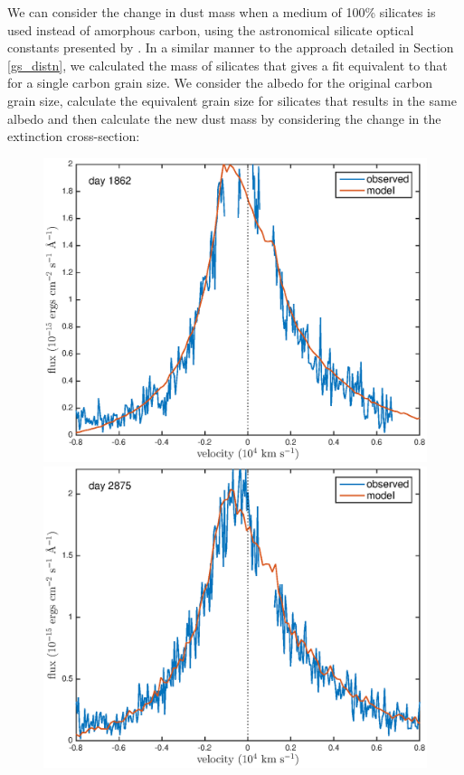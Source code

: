 \documentclass[useAMS,usenatbib,usegraphicx]{mnras}
\begin{document}
We can consider the change in dust mass when a medium of 100\% silicates is used instead of amorphous carbon, using the astronomical silicate optical constants presented by \cite{Draine1984}.  In a similar manner to the approach detailed in Section \ref{gs_distn}, we  calculated the mass of silicates that gives a fit equivalent to that for a single carbon grain size.  We consider the albedo for the original carbon grain size, calculate the equivalent grain size for silicates that results in the same albedo and then calculate the new dust mass by considering the change in the extinction cross-section:

\begin{figure}

\includegraphics[trim =33 10 45 15,clip=true,scale=0.35]{clump_1/maximum/d1862Ha}
\includegraphics[trim =55 10 45 15,clip=true,scale=0.35]{clump_1/maximum/d2875Ha}

\end{figure}
\end{document}
